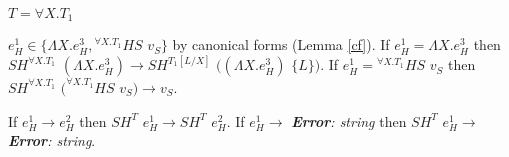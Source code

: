 \begin{case}
\begin{subcase}
\end{subcase}

\begin{subcase}

$T=\forall X.T_{1}$

$e_{H}^{1}\in\lbrace\Lambda X.e_{H}^{3},{^{\forall X.T_{1}}H}S$ $v_{S}\rbrace$ by canonical forms (Lemma \ref{cf}).  If $e_{H}^{1}=\Lambda X.e_{H}^{3}$ then $SH^{\forall X.T_{1}}$ $(\Lambda X.e_{H}^{3})\rightarrow SH^{T_{1}[L/X]}$ $((\Lambda X.e_{H}^{3})$ $\lbrace L\rbrace)$.  If $e_{H}^{1}={^{\forall X.T_{1}}H}S$ $v_{S}$ then $SH^{\forall X.T_{1}}$ $(^{\forall X.T_{1}}HS$ $v_{S})\rightarrow v_{S}$.

\end{subcase}

If $e_{H}^{1}\rightarrow e_{H}^{2}$ then $SH^{T}$ $e_{H}^{1}\rightarrow SH^{T}$ $e_{H}^{2}$.  If $e_{H}^{1}\rightarrow$ \emph{\textbf{Error}: string} then $SH^{T}$ $e_{H}^{1}\rightarrow$ \emph{\textbf{Error}: string}.

\end{case}
